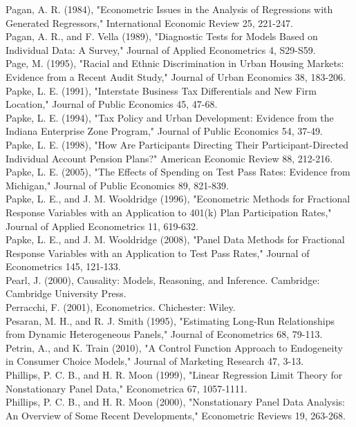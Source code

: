 \documentclass[10pt]{article}
\begin{document}
Pagan, A. R. (1984), "Econometric Issues in the Analysis of Regressions with Generated Regressors," International Economic Review 25, 221-247.\\
Pagan, A. R., and F. Vella (1989), "Diagnostic Tests for Models Based on Individual Data: A Survey," Journal of Applied Econometrics 4, S29-S59.\\
Page, M. (1995), "Racial and Ethnic Discrimination in Urban Housing Markets: Evidence from a Recent Audit Study," Journal of Urban Economics 38, 183-206.\\
Papke, L. E. (1991), "Interstate Business Tax Differentials and New Firm Location," Journal of Public Economics 45, 47-68.\\
Papke, L. E. (1994), "Tax Policy and Urban Development: Evidence from the Indiana Enterprise Zone Program," Journal of Public Economics 54, 37-49.\\
Papke, L. E. (1998), "How Are Participants Directing Their Participant-Directed Individual Account Pension Plans?" American Economic Review 88, 212-216.\\
Papke, L. E. (2005), "The Effects of Spending on Test Pass Rates: Evidence from Michigan," Journal of Public Economics 89, 821-839.\\
Papke, L. E., and J. M. Wooldridge (1996), "Econometric Methods for Fractional Response Variables with an Application to 401(k) Plan Participation Rates," Journal of Applied Econometrics 11, 619-632.\\
Papke, L. E., and J. M. Wooldridge (2008), "Panel Data Methods for Fractional Response Variables with an Application to Test Pass Rates," Journal of Econometrics 145, 121-133.\\
Pearl, J. (2000), Causality: Models, Reasoning, and Inference. Cambridge: Cambridge University Press.\\
Perracchi, F. (2001), Econometrics. Chichester: Wiley.\\
Pesaran, M. H., and R. J. Smith (1995), "Estimating Long-Run Relationships from Dynamic Heterogeneous Panels," Journal of Econometrics 68, 79-113.\\
Petrin, A., and K. Train (2010), "A Control Function Approach to Endogeneity in Consumer Choice Models," Journal of Marketing Research 47, 3-13.\\
Phillips, P. C. B., and H. R. Moon (1999), "Linear Regression Limit Theory for Nonstationary Panel Data," Econometrica 67, 1057-1111.\\
Phillips, P. C. B., and H. R. Moon (2000), "Nonstationary Panel Data Analysis: An Overview of Some Recent Developments," Econometric Reviews 19, 263-268.\\
\end{document}
